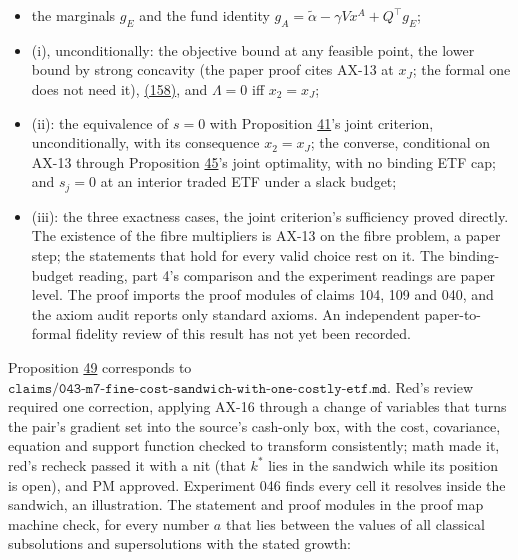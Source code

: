 \documentclass[11pt]{article}
\begin{document}
\begin{itemize}
  \item the marginals \(g_E\) and the fund identity \(g_A=\tilde\alpha-\gamma Vx^A+Q^\top g_E\);
  \item (i), unconditionally: the objective bound at any feasible point, the
  lower bound by strong concavity (the paper proof cites AX-13 at \(x_J\);
  the formal one does not need it), \hyperref[eq:158]{(158)}, and \(\Lambda=0\) iff \(x_2=x_J\);
  \item (ii): the equivalence of \(s=0\) with Proposition \hyperref[res:Proposition-41]{41}'s joint criterion,
  unconditionally, with its consequence \(x_2=x_J\); the converse, conditional
  on AX-13 through Proposition \hyperref[res:Proposition-45]{45}'s joint optimality, with no binding
  ETF cap; and \(s_j=0\) at an interior traded ETF under a slack budget;
  \item (iii): the three exactness cases, the joint criterion's sufficiency
  proved directly.
The existence of the fibre multipliers is AX-13 on the fibre problem, a
paper step; the statements that hold for every valid choice rest on it.
The binding-budget reading, part 4's comparison and the experiment
readings are paper level. The proof imports the proof modules of
claims 104, 109 and 040, and the axiom audit reports only standard
axioms. An independent paper-to-formal fidelity review of this result
has not yet been recorded.
\end{itemize}

Proposition \hyperref[res:Proposition-49]{49} corresponds to
\(\texttt{claims/043-m7-fine-cost-sandwich-with-one-costly-etf.md}\). Red's review
required one correction, applying AX-16 through a change of variables
that turns the pair's gradient set into the source's cash-only box,
with the cost, covariance, equation and support function checked to
transform consistently; math made it, red's recheck passed it with a
nit (that \(k^*\) lies in the sandwich while its position is open), and PM
approved. Experiment 046 finds every cell it resolves inside the
sandwich, an illustration. The statement and proof modules in the proof
map machine check, for every number \(a\) that lies between the values of
all classical subsolutions and supersolutions with the stated growth:
\end{document}
